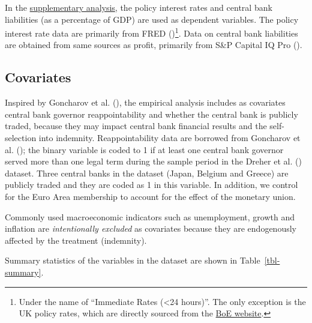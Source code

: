 \documentclass[
  a4paper,
  abstract=true]{scrartcl}
\theoremstyle{definition}
\begin{document}
In the \hyperref[sec-bias]{supplementary analysis}, the policy interest
rates and central bank liabilities (as a percentage of GDP) are used as
dependent variables. The policy interest rate data are primarily from
FRED ()\footnote{Under the name of
  ``Immediate Rates (\textless24 hours)''. The only exception is the UK
  policy rates, which are directly sourced from the
  \href{https://www.bankofengland.co.uk/-/media/boe/files/monetary-policy/baserate.xls}{BoE
  website}.}. Data on central bank liabilities are obtained from same
sources as profit, primarily from S\&P Capital IQ Pro
().

\subsection{Covariates}\label{covariates}

Inspired by Goncharov et al. (), the
empirical analysis includes as covariates central bank governor
reappointability and whether the central bank is publicly traded,
because they may impact central bank financial results and the
self-selection into indemnity. Reappointability data are borrowed from
Goncharov et al. (); the binary
variable is coded to 1 if at least one central bank governor served more
than one legal term during the sample period in the Dreher et al.
() dataset. Three central banks in the
dataset (Japan, Belgium and Greece) are publicly traded and they are
coded as 1 in this variable. In addition, we control for the Euro Area
membership to account for the effect of the monetary union.

Commonly used macroeconomic indicators such as unemployment, growth and
inflation are \emph{intentionally excluded} as covariates because they
are endogenously affected by the treatment (indemnity).

Summary statistics of the variables in the dataset are shown in
Table~\ref{tbl-summary}.
\end{document}
